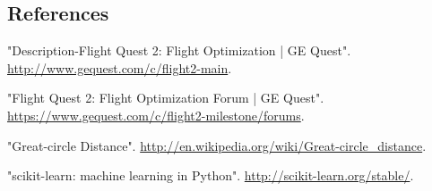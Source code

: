 \documentclass{article}[12pt]
\begin{document}
\begin{multicols}{2}
\section{References}
\begin{thebibliography}{1}

 "Description-Flight Quest 2: Flight Optimization | GE Quest". \url{http://www.gequest.com/c/flight2-main}.

 "Flight Quest 2: Flight Optimization Forum | GE Quest". \url{https://www.gequest.com/c/flight2-milestone/forums}.

 "Great-circle Distance". \url{http://en.wikipedia.org/wiki/Great-circle_distance}.

 "scikit-learn: machine learning in Python". \url{http://scikit-learn.org/stable/}.

\end{thebibliography}
\end{multicols}
\end{document}
